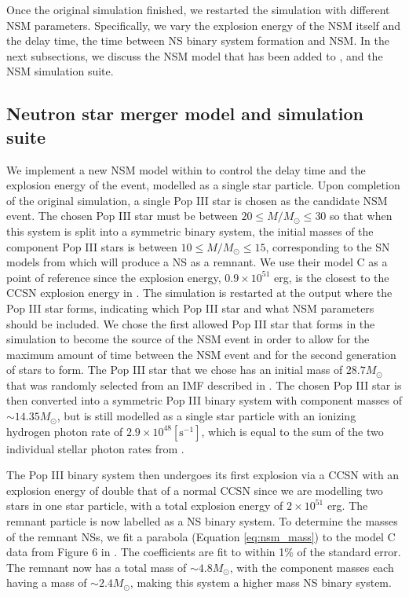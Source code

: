 \documentclass[fleqn,usenatbib]{mnras}
\begin{document}
Once the original simulation finished, we restarted the simulation with different NSM parameters. Specifically, we vary the explosion energy of the NSM itself and the delay time, the time between NS binary system formation and NSM. In the next subsections, we discuss the NSM model that has been added to \enzo{}, and the NSM simulation suite.

\subsection{Neutron star merger model and simulation suite} \label{sec:NSM_model}
We implement a new NSM model within \enzo{} to control the delay time and the explosion energy of the event, modelled as a single star particle. Upon completion of the original simulation, a single Pop III star is chosen as the candidate NSM event. The chosen Pop III star must be between $20 \leq M / M_{\odot} \leq 30$ so that when this system is split into a symmetric binary system, the initial masses of the component Pop III stars is between $10 \leq M / M_{\odot} \leq 15$, corresponding to the SN models from \citet{Heger10} which will produce a NS as a remnant. We use their model C as a point of reference since the explosion energy, $0.9 \times 10^{51}$ erg, is the closest to the CCSN explosion energy in \enzo{}. The simulation is restarted at the output where the Pop III star forms, indicating which Pop III star and what NSM parameters should be included. We chose the first allowed Pop III star that forms in the simulation to become the source of the NSM event in order to allow for the maximum amount of time between the NSM event and for the second generation of stars to form. The Pop III star that we chose has an initial mass of $28.7 M_{\odot}$ that was randomly selected from an IMF described in \citet{Skinner20}. The chosen Pop III star is then converted into a symmetric Pop III binary system with component masses of $\sim 14.35 M_{\odot}$, but is still modelled as a single star particle with an ionizing hydrogen photon rate of $2.9 \times 10^{48} [\mathrm{s}^{-1}]$, which is equal to the sum of the two individual stellar photon rates from \citet{Schaerer02}.

The Pop III binary system then undergoes its first explosion via a CCSN with an explosion energy of double that of a normal CCSN since we are modelling two stars in one star particle, with a total explosion energy of $2 \times 10^{51}$ erg. The remnant particle is now labelled as a NS binary system. To determine the masses of the remnant NSs, we fit a parabola (Equation \ref{eq:nsm_mass}) to the model C data from Figure 6 in \citet{Heger10}. The coefficients are fit to within 1\% of the standard error. The remnant now has a total mass of $\sim 4.8 M_{\odot}$, with the component masses each having a mass of $\sim 2.4 M_{\odot}$, making this system a higher mass NS binary system.
\end{document}
